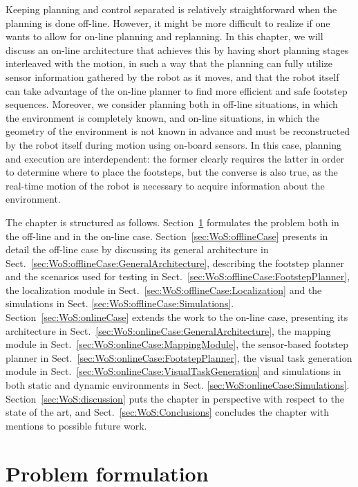 Keeping planning and control separated is relatively straightforward when the planning is done off-line. However, it might be more difficult to realize if one wants to allow for on-line planning and replanning. In this chapter, we will discuss an on-line architecture that achieves this by having short planning stages interleaved with the motion, in such a way that the planning can fully utilize sensor information gathered by the robot as it moves, and that the robot itself can take advantage of the on-line planner to find more efficient and safe footstep sequences.
Moreover, we consider planning both in off-line situations, in which the environment is completely known, and on-line situations, in which the geometry of the environment is not known in advance and must be reconstructed by the robot itself during motion using on-board sensors. In this case, planning and execution are interdependent: the former clearly requires the latter in order to determine where to place the footsteps, but the converse is also true, as the real-time motion of the robot is necessary to acquire information about the environment.

The chapter is structured as follows. Section~\ref{sec:WoS:Formulation} formulates the problem both in the off-line and in the on-line case. Section~\ref{sec:WoS:offlineCase} presents in detail the off-line case by discussing its general architecture in Sect.~\ref{sec:WoS:offlineCase:GeneralArchitecture}, describing the footstep planner and the scenarios used for testing in Sect.~\ref{sec:WoS:offlineCase:FootstepPlanner}, the localization module in Sect.~\ref{sec:WoS:offlineCase:Localization} and the simulations in Sect. \ref{sec:WoS:offlineCase:Simulations}. Section~\ref{sec:WoS:onlineCase} extends the work to the on-line case, presenting its architecture in Sect.~\ref{sec:WoS:onlineCase:GeneralArchitecture}, the mapping module in Sect.~\ref{sec:WoS:onlineCase:MappingModule}, the sensor-based footstep planner in Sect.~\ref{sec:WoS:onlineCase:FootstepPlanner}, the visual task generation module in Sect.~\ref{sec:WoS:onlineCase:VisualTaskGeneration} and simulations in both static and dynamic environments in Sect. \ref{sec:WoS:onlineCase:Simulations}. Section~\ref{sec:WoS:discussion} puts the chapter in perspective with respect to the state of the art, and Sect.~\ref{sec:WoS:Conclusions} concludes the chapter with mentions to possible future work.

	
\section{Problem formulation}
\label{sec:WoS:Formulation}


